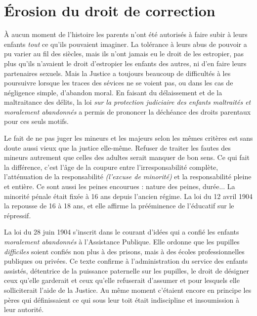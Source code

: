 {\section{Érosion du droit de correction}

 À aucun moment de l'histoire les parents n'ont été autorisés à faire subir à leurs enfants \emph{tout} ce qu'ils pouvaient imaginer. La tolérance à leurs abus de pouvoir a pu varier au fil des siècles, mais ils n'ont jamais eu le droit de les estropier, pas plus qu'ils n'avaient le droit d'estropier les enfants des autres, ni d'en faire leurs partenaires sexuels. Mais la Justice a toujours beaucoup de difficultés à les poursuivre lorsque les traces des sévices ne se voient pas, ou dans les cas de négligence simple, d'abandon moral. En faisant du délaissement et de la maltraitance des délits, la loi {\emph{sur la protection judiciaire des enfants maltraités et moralement abandonnés}} a permis de prononcer la déchéance des droits parentaux pour ces seuls motifs. 

 Le fait de ne pas juger les mineurs et les majeurs selon les mêmes critères est sans doute aussi vieux que la justice elle-même. Refuser de traiter les fautes des mineurs autrement que celles des adultes serait manquer de bon sens. Ce qui fait la différence, c'est l'âge de la coupure entre l'irresponsabilité complète, l'atténuation de la responsabilité \emph{(l'excuse de minorité)} et la responsabilité pleine et entière. Ce sont aussi les peines encourues : nature des peines, durée... La minorité pénale était fixée à 16 ans depuis l'ancien régime. La loi du 12 avril 1904 la repousse de 16 à 18 ans, et elle affirme la prééminence de l'éducatif sur le répressif.

 La loi du 28 juin 1904 s'inscrit dans le courant d'idées qui a confié les enfants \emph{moralement abandonnés} à l'Assistance Publique. Elle ordonne que les pupilles \emph{difficiles} soient confiés non plus à des prisons, mais à des écoles professionnelles publiques ou privées. Ce texte confirme à l'administration du service des enfants assistés, détentrice de la puissance paternelle sur les pupilles, le droit de désigner ceux qu'elle garderait et ceux qu'elle refuserait d'assumer et pour lesquels elle solliciterait l'aide de la Justice. Au même moment c'étaient encore en principe les pères qui définissaient ce qui sous leur toit était indiscipline et insoumission à leur autorité.

}
